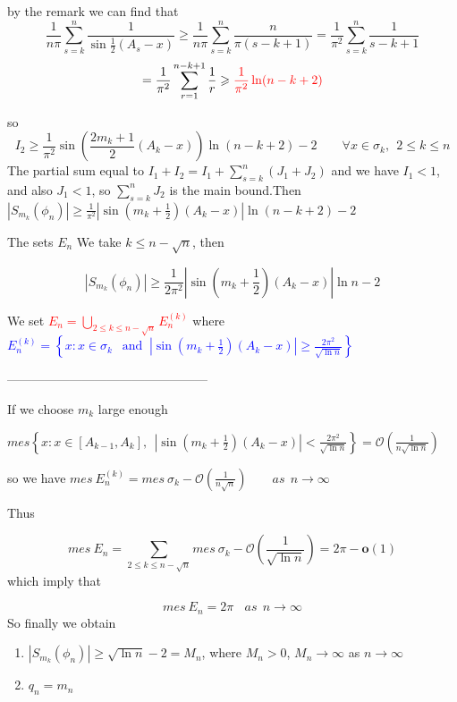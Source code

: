 \documentclass{beamer}
\begin{document}
\begin{frame}
    by the remark  we can find that 
\[ \frac{1}{n\pi}\sum_{s=k}^{n}\frac{1}{\sin\frac{1}{2}(A_s-x)} \geqslant \frac{1}{n\pi}\sum_{s=k}^{n}\frac{n}{\pi(s-k+1)}=\frac{1}{\pi^2}\sum_{s=k}^{n}\frac{1}{s-k+1} \]\[=\frac{1}{\pi^2}\sum_{r=1}^{n-k+1}\frac{1}{r} \geqslant \textcolor{red}{ \frac{1}{\pi^2}\ln(n-k+2) }\] 


so 
\[ I_2 \geqslant \frac{1}{\pi^2}\sin\left(\frac{2m_k+1}{2}(A_k-x) \right)\ln(n-k+2)-2  \quad \quad \forall x \in \sigma_k, \ \ 2 \leqslant k \leqslant n\] 
The partial sum equal to $ I_1 +I_2 = I_1+ \sum_{s=k}^{n}(J_1+J_2)$ and we have $ I_1 < 1$, and also $J_1 < 1 $, so $\sum_{s=k}^{n} J_2 $ is the main bound.Then $ | S_{m_k}(\phi_n)|\geqslant \frac{1}{\pi^2}|\sin(m_k +\frac{1}{2})(A_k-x)|\ln(n-k+2) -2 $\par
\end{frame}


\begin{frame}{The sets $ E_n $}
    We take $ k \leqslant n - \sqrt{n} $, then

\[  | S_{m_k}(\phi_n)| \geqslant \frac{1}{2\pi^2}|\sin(m_k +\frac{1}{2})(A_k-x)|\ln n-2\]

We set \textcolor{red}{$E_n= \bigcup_{2 \leqslant k \leqslant n-\sqrt{n}}E_n^{(k)} $}
where \textcolor{blue}{$E_n^{(k)}=\left\{ x: x \in \sigma_k \ \ \text{ and } \ |\sin(m_k +\frac{1}{2})(A_k-x)| \geqslant \frac{2\pi^2}{\sqrt{\ln n}}\right\}$}\par
————————————————\par
If we choose $ m_k $ large enough 

$ mes\left\{x: x \in \left[ A_{k-1},A_k \right], \ \  |\sin(m_k +\frac{1}{2})(A_k-x)| < \frac{2\pi^2}{\sqrt{\ln n}}\right\}=\mathcal{O}(\frac{1}{n\sqrt{\ln n}})$

so we have $ mes\  E_n^{(k)} = mes \ \sigma_k- \mathcal{O}(\frac{1}{n\sqrt{n}}) \quad \quad as \ \ n \rightarrow \infty$

Thus 
\end{frame}

\begin{frame}
    \[ mes\ E_n= \sum_{2 \leqslant k \leqslant n- \sqrt{n}}mes\ \sigma_k- \mathcal{O}(\frac{1}{\sqrt{\ln n}}) = 2\pi - \mathbf{o}  (1) \]
which imply that 

\[ mes \ E_n=2\pi \ \ \ \ as \  \ n \rightarrow \infty \]
So finally we obtain 
\begin{enumerate}
    \item $ | S_{m_k}(\phi_n)| \geqslant \sqrt{\ln n } -2 = M_n$,  where $ M_n >0 $, $ M_n \rightarrow \infty $ as $ n \rightarrow \infty $
    \item $q_n=m_n$
\end{enumerate}

\end{frame}
\end{document}
